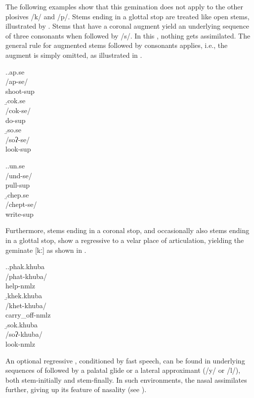 The following examples show that this gemination does not apply to the other plosives /k/ and /p/. Stems ending in a glottal stop are treated like open stems, illustrated by \Next[c].	Stems that have a coronal augment yield an underlying sequence of three consonants when followed by /s/. In this , nothing gets assimilated. The general rule for augmented stems followed by consonants applies, i.e.,  the augment is simply omitted, as illustrated in \NNext. 
			
		\ex.\a.\glll ap.se\\
		/ap-se/\\
shoot{\sc -sup}\\
\b.\glll cok.se\\
/cok-se/\\
do{\sc -sup}\\
	\b.\glll so.se\\
/soʔ-se/\\
look{\sc -sup}\\
			
			
\ex.\a.\glll un.se\\
		/und-se/\\
		pull{\sc -sup}\\
		\b.\glll  chep.se\\	
			/chept-se/\\
			write{\sc -sup}\\
			
			
Furthermore, stems ending in a coronal stop, and occasionally also stems ending in a glottal stop, show a regressive   to a velar place of articulation, yielding the geminate [kː] as shown in \Next.
			
			\ex.\a.\glll phak.khuba\\
		/phat-khuba/\\
		help{\sc -nmlz}\\
		\b.\glll khek.khuba\\
		/khet-khuba/\\
		carry\_off{\sc -nmlz}\\
		\b.\glll sok.khuba\\
		/soʔ-khuba/\\
		look{\sc -nmlz}\\
	
	
An optional regressive , conditioned by fast speech, can be found in underlying sequences of  followed by a palatal glide or a lateral approximant (/y/ or /l/), both stem-initially and stem-finally. In such environments, the nasal assimilates further, giving up its feature of nasality (see \Next). 

